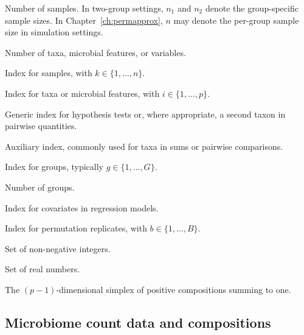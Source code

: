 \notationsettings{1cm}
\begin{notationlist}
	\item[$n$] Number of samples. In two-group settings, $n_1$ and $n_2$ denote the group-specific sample sizes. In Chapter~\ref{ch:permapprox}, $n$ may denote the per-group sample size in simulation settings.
	
	\item[$p$] Number of taxa, microbial features, or variables.
	
	\item[$k$] Index for samples, with $k \in \{1,\ldots,n\}$.
	
	\item[$i$] Index for taxa or microbial features, with $i \in \{1,\ldots,p\}$.
	
	\item[$j$] Generic index for hypothesis tests or, where appropriate, a second taxon in pairwise quantities.
	
	\item[$\ell$] Auxiliary index, commonly used for taxa in sums or pairwise comparisons.
	
	\item[$g$] Index for groups, typically $g \in \{1,\ldots,G\}$.
	
	\item[$G$] Number of groups.
	
	\item[$h$] Index for covariates in regression models.
	
	\item[$b$] Index for permutation replicates, with $b \in \{1,\ldots,B\}$.
	
	\item[$\mathbb{N}_0$] Set of non-negative integers.
	
	\item[$\mathbb{R}$] Set of real numbers.
	
	\item[$\mathcal{S}^{p-1}$] The $(p-1)$-dimensional simplex of positive compositions summing to one.
\end{notationlist}

\subsection*{Microbiome count data and compositions}

